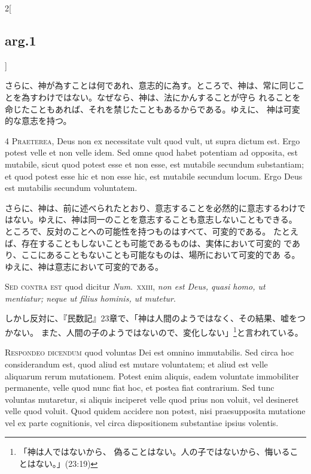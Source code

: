 \documentclass[paper=a4paper,fontsize=10pt,jafontsize=9pt,titlepage]{jlreq}
\begin{document}
\begin{paracol}{2}[\subsection{arg.1}]
\switchcolumn

さらに、神が為すことは何であれ、意志的に為す。ところで、神は、常に同じこ
 とを為すわけではない。なぜなら、神は、法にかんすることが守ら
 れることを命じたこともあれば、それを禁じたこともあるからである。ゆえに、
 神は可変的な意志を持つ。



{\scshape 4 Praeterea}, Deus non ex necessitate vult
 quod vult, ut supra dictum est. Ergo potest velle et non velle
 idem. Sed omne quod habet potentiam ad opposita, est mutabile, sicut
 quod potest esse et non esse, est mutabile secundum substantiam; et
 quod potest esse hic et non esse hic, est mutabile secundum locum. Ergo
 Deus est mutabilis secundum voluntatem.

\switchcolumn

さらに、神は、前に述べられたとおり、意志することを必然的に意志するわけで
 はない。ゆえに、神は同一のことを意志することも意志しないこともできる。
ところで、反対のことへの可能性を持つものはすべて、可変的である。
たとえば、存在することもしないことも可能であるものは、実体において可変的
 であり、ここにあることもないことも可能なものは、場所において可変的であ
 る。ゆえに、神は意志において可変的である。

\switchcolumn*[\subsection{s.c.}]


{\scshape Sed contra est} quod dicitur {\itshape Num}.~{\scshape xxiii},
 {\itshape non est Deus, quasi homo, ut mentiatur; neque ut filius hominis, ut
 mutetur}.

\switchcolumn

しかし反対に、『民数記』23章で、「神は人間のようではなく、その結果、嘘をつかない。
 また、人間の子のようではないので、変化しない」\footnote{「神は人ではないから、
 偽ることはない。人の子ではないから、悔いることはない。」(23:19)}と言われている。



{\scshape Respondeo dicendum} quod voluntas Dei est omnino immutabilis. Sed
 circa hoc considerandum est, quod aliud est mutare voluntatem; et aliud est
 velle aliquarum rerum mutationem. Potest enim aliquis, eadem voluntate
 immobiliter permanente, velle quod nunc fiat hoc, et postea fiat
 contrarium. Sed tunc voluntas mutaretur, si aliquis inciperet velle quod prius
 non voluit, vel desineret velle quod voluit. Quod quidem accidere non potest,
 nisi praesupposita mutatione vel ex parte cognitionis, vel circa dispositionem
 substantiae ipsius volentis.


\end{paracol}
\end{document}
